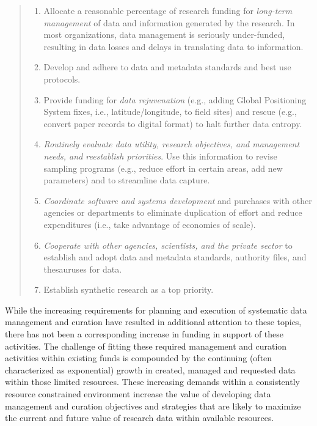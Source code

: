 \documentclass[paper]{ijdc-v9}
\begin{document}
\begin{quote}
\begin{enumerate}
\def\labelenumi{\arabic{enumi}.}
\item
  Allocate a reasonable percentage of research funding for
  \emph{long-term management} of data and information generated by the
  research. In most organizations, data management is seriously
  under-funded, resulting in data losses and delays in translating data
  to information.
\item
  Develop and adhere to data and metadata standards and best use
  protocols.
\item
  Provide funding for \emph{data rejuvenation} (e.g., adding Global
  Positioning System fixes, i.e., latitude/longitude, to field sites)
  and rescue (e.g., convert paper records to digital format) to halt
  further data entropy.
\item
  \emph{Routinely evaluate data utility, research objectives, and
  management needs, and reestablish priorities}. Use this information to
  revise sampling programs (e.g., reduce effort in certain areas, add
  new parameters) and to streamline data capture.
\item
  \emph{Coordinate software and systems development} and purchases with
  other agencies or departments to eliminate duplication of effort and
  reduce expenditures (i.e., take advantage of economies of scale).
\item
  \emph{Cooperate with other agencies, scientists, and the private
  sector} to establish and adopt data and metadata standards, authority
  files, and thesauruses for data.
\item
  Establish synthetic research as a top priority. \autocite[pp 434.
  Emphasis added.]{michener_role_1999}
\end{enumerate}
\end{quote}

While the increasing requirements for planning and execution of
systematic data management and curation have resulted in additional
attention to these topics, there has not been a corresponding increase
in funding in support of these activities. The challenge of fitting
these required management and curation activities within existing funds
is compounded by the continuing (often characterized as exponential)
growth
\autocites{turner_executive_2016}{national_aeronautics_and_space_administration_nasa_heasarc_2016}
in created, managed and requested data within those limited resources.
These increasing demands within a consistently resource constrained
environment increase the value of developing data management and
curation objectives and strategies that are likely to maximize the
current and future value of research data within available resources.
\end{document}
